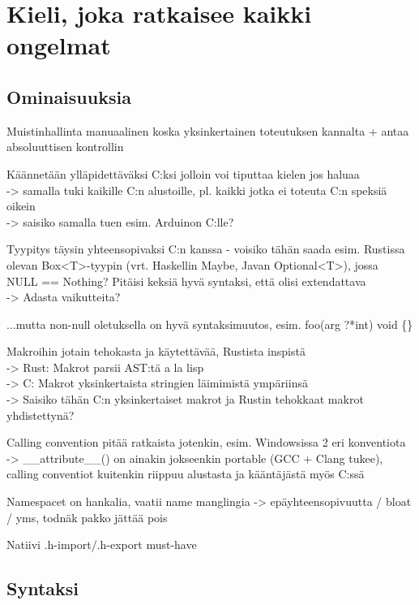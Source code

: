 \section{Kieli, joka ratkaisee kaikki ongelmat} 

\subsection{Ominaisuuksia}

Muistinhallinta manuaalinen koska yksinkertainen toteutuksen kannalta + antaa
absoluuttisen kontrollin

Käännetään ylläpidettäväksi C:ksi jolloin voi tiputtaa kielen jos haluaa \\
-> samalla tuki kaikille C:n alustoille, pl. kaikki jotka ei toteuta C:n speksiä oikein \\
-> saisiko samalla tuen esim. Arduinon C:lle?

Tyypitys täysin yhteensopivaksi C:n kanssa - voisiko tähän saada esim.
Rustissa olevan Box<T>-tyypin (vrt. Haskellin Maybe, Javan Optional<T>), jossa \\
NULL == Nothing? Pitäisi keksiä hyvä syntaksi, että olisi extendattava \\
-> Adasta vaikutteita?

...mutta non-null oletuksella on hyvä syntaksimuutos, esim.
foo(arg ?*int) void \{\}

Makroihin jotain tehokasta ja käytettävää, Rustista inspistä \\
-> Rust: Makrot parsii AST:tä a la lisp \\
-> C: Makrot yksinkertaista stringien läimimistä ympäriinsä \\
-> Saisiko tähän C:n yksinkertaiset makrot ja Rustin tehokkaat makrot
yhdistettynä?

Calling convention pitää ratkaista jotenkin, esim. Windowsissa 2 eri
konventiota \\
-> \_\_attribute\_\_() on ainakin jokseenkin portable (GCC + Clang tukee),
calling conventiot kuitenkin riippuu alustasta ja kääntäjästä myös C:ssä

Namespacet on hankalia, vaatii name manglingia -> epäyhteensopivuutta / bloat /
yms, todnäk pakko jättää pois

Natiivi .h-import/.h-export must-have

\subsection{Syntaksi}

